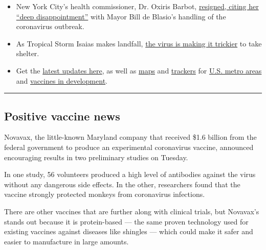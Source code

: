 \begin{itemize}
\item
  New York City's health commissioner, Dr. Oxiris Barbot,
  \href{https://www.nytimes.com/2020/08/04/nyregion/oxiris-barbot-health-commissioner-resigns.html}{resigned,
  citing her ``deep disappointment''} with Mayor Bill de Blasio's
  handling of the coronavirus outbreak.
\item
  As Tropical Storm Isaias makes landfall,
  \href{https://www.nytimes.com/2020/08/04/world/coronavirus-cases.html?action=click\&module=Top\%20Stories\&pgtype=Homepage\#link-5c0d6427}{the
  virus is making it trickier} to take shelter.
\item
  Get the \href{https://www.nytimes.com/news-event/coronavirus}{latest
  updates here}, as well as
  \href{https://www.nytimes.com/interactive/2020/world/asia/china-wuhan-coronavirus-maps.html?action=click\&pgtype=Article\&state=default\&module=styln-coronavirus\&variant=show\&region=TOP_BANNER\&context=storyline_menu}{maps}
  and
  \href{https://www.nytimes.com/interactive/2020/04/03/upshot/coronavirus-metro-area-tracker.html}{trackers}
  for
  \href{https://www.nytimes.com/interactive/2020/04/03/upshot/coronavirus-metro-area-tracker.html}{U.S.
  metro areas} and
  \href{https://www.nytimes.com/interactive/2020/science/coronavirus-vaccine-tracker.html}{vaccines
  in development}.
\end{itemize}

\begin{center}\rule{0.5\linewidth}{\linethickness}\end{center}

\hypertarget{positive-vaccine-news}{%
\subsection{Positive vaccine news}\label{positive-vaccine-news}}

Novavax, the little-known Maryland company that received \$1.6 billion
from the federal government to produce an experimental coronavirus
vaccine, announced encouraging results in two preliminary studies on
Tuesday.

In one study, 56 volunteers produced a high level of antibodies against
the virus without any dangerous side effects. In the other, researchers
found that the vaccine strongly protected monkeys from coronavirus
infections.

There are other vaccines that are further along with clinical trials,
but Novavax's stands out because it is protein-based --- the same proven
technology used for existing vaccines against diseases like shingles ---
which could make it safer and easier to manufacture in large amounts.


